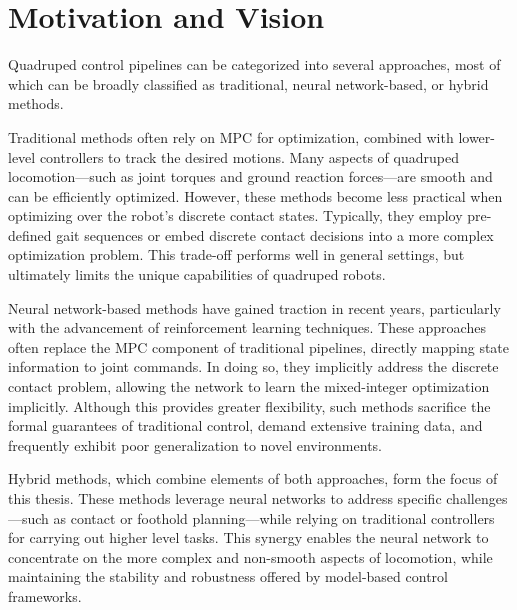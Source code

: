 \section{Motivation and Vision}

Quadruped control pipelines can be categorized into several
approaches, most of which can be broadly classified as traditional,
neural network-based, or hybrid methods.

Traditional methods often rely on MPC for
optimization, combined with lower-level controllers to track the
desired motions. Many aspects of quadruped locomotion—such as joint
torques and ground reaction forces—are smooth and can be efficiently
optimized. However, these methods become less practical when
optimizing over the robot's discrete contact states. Typically, they
employ pre-defined gait sequences or embed discrete contact decisions
into a more complex optimization problem. This trade-off performs well
in general settings, but ultimately limits the unique capabilities of
quadruped robots.

Neural network-based methods have gained traction in recent years,
particularly with the advancement of reinforcement learning
techniques. These approaches often replace the MPC component of
traditional pipelines, directly mapping state information to joint
commands. In doing so, they implicitly address the discrete contact
problem, allowing the network to learn the mixed-integer optimization
implicitly. Although this provides greater flexibility, such methods
sacrifice the formal guarantees of traditional control, demand
extensive training data, and frequently exhibit poor generalization
to novel environments.

Hybrid methods, which combine elements of both approaches, form the
focus of this thesis. These methods leverage neural networks to
address specific challenges—such as contact or foothold
planning—while relying on traditional controllers for carrying out
higher level tasks. This synergy enables the neural network to
concentrate on the more complex and non-smooth aspects of
locomotion, while maintaining the stability and robustness offered
by model-based control frameworks.
